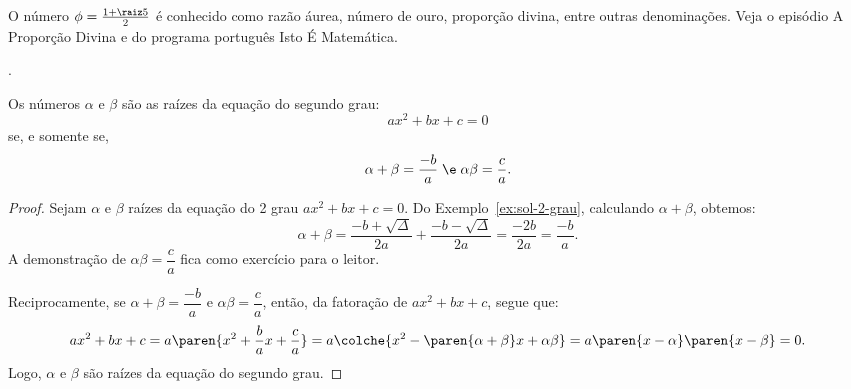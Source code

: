 \begin{remark}
	O número $\phi = \frac {1 + \raiz 5} 2$ é conhecido como razão áurea, número de ouro, proporção divina, entre outras denominações.
	Veja o episódio A Proporção Divina  e  do programa português Isto É Matemática.
\end{remark}

\begin{onlineact}
	.
\end{onlineact}

\begin{theorem}
	Os números $\alpha$ e $\beta$ são as raízes da equação do segundo grau:
	\[
		ax^2 + bx + c = 0
	\]
	se, e somente se,
	\[
		\alpha + \beta = \dfrac {-b} a \; \e \; \alpha \beta = \dfrac c a.
	\]
\end{theorem}

\begin{proof}
	Sejam $\alpha$ e $\beta$ raízes da equação do 2\tdeg{} grau $ax^2 + bx + c = 0$. Do Exemplo~\ref{ex:sol-2-grau}, calculando $\alpha+\beta$, obtemos:
	\[
		\alpha+\beta = \dfrac{-b+\sqrt\Delta}{2a}+\dfrac{-b-\sqrt\Delta}{2a} = \dfrac{-2b}{2a}=\dfrac{-b}{a}.
	\]
	A demonstração de $\alpha\beta = \dfrac c a$ fica como exercício para o leitor.

    Reciprocamente, se $\alpha+\beta = \dfrac {-b} a$ e $\alpha\beta = \dfrac c a$, então, da fatoração de $ax^2 + bx + c$, segue que:
    \[
        ax^2 + bx + c = a\paren{x^2 + \frac {b} a x+ \frac c a} = a\colche{x^2  -\paren{\alpha+\beta} x+ \alpha\beta} = a\paren{x - \alpha}\paren{x - \beta} = 0.
    \]
    Logo, $\alpha$ e $\beta$ são raízes da equação do segundo grau.
\end{proof}
